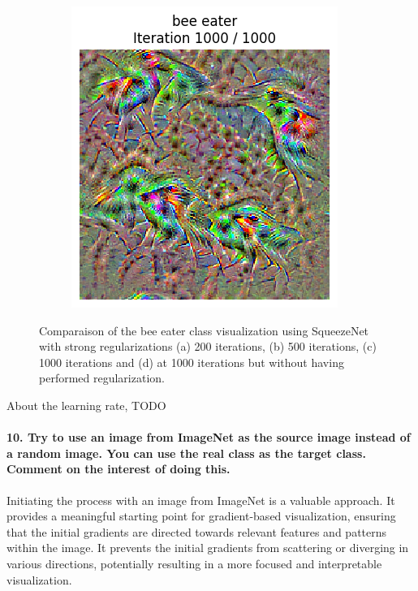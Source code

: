 \begin{figure}[H]
\begin{subfigure}[t]{.25\textwidth}
        \includegraphics[width=\linewidth]{SqueezeNet/bird_animated_1000_last_frame.png}
        \caption{}
        \label{fig:class_viz_iter:sub4}
    \end{subfigure}
    \caption{Comparaison of the bee eater class visualization using SqueezeNet with strong regularizations (a) 200 iterations, (b) 500 iterations, (c) 1000 iterations and (d) at 1000 iterations but without having performed regularization.}
    \label{fig:class_viz_iter}
\end{figure}
About the learning rate, TODO

\paragraph*{10. Try to use an image from ImageNet as the source image instead of a random image. You can use the real class as the target class. Comment on the interest of doing this.}

Initiating the process with an image from ImageNet is a valuable approach. It provides a meaningful starting point for gradient-based visualization, ensuring that the initial gradients are directed towards relevant features and patterns within the image. It prevents the initial gradients from scattering or diverging in various directions, potentially resulting in a more focused and interpretable visualization.

